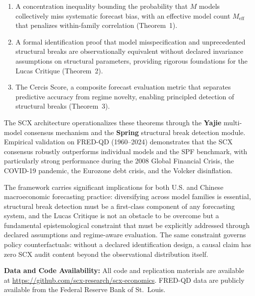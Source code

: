\documentclass[12pt,a4paper]{article}
\begin{document}
\begin{enumerate}[label=(\arabic*), leftmargin=*]
    \item A concentration inequality bounding the probability that
    $M$ models collectively miss systematic forecast bias, with an
    effective model count $M_{\text{eff}}$ that penalizes within-family
    correlation (Theorem~1).

    \item A formal identification proof that model misspecification
    and unprecedented structural breaks are observationally equivalent
    without declared invariance assumptions on structural parameters,
    providing rigorous foundations for the Lucas Critique (Theorem~2).

    \item The Cercis Score, a composite forecast evaluation metric
    that separates predictive accuracy from regime novelty, enabling
    principled detection of structural breaks (Theorem~3).
\end{enumerate}

The SCX architecture operationalizes these theorems through the
\textbf{Yajie} multi-model consensus mechanism and the \textbf{Spring}
structural break detection module.  Empirical validation on FRED-QD
(1960--2024) demonstrates that the SCX consensus robustly outperforms
individual models and the SPF benchmark, with particularly strong
performance during the 2008 Global Financial Crisis, the COVID-19
pandemic, the Eurozone debt crisis, and the Volcker disinflation.

The framework carries significant implications for both U.S. and
Chinese macroeconomic forecasting practice: diversifying across model
families is essential, structural break detection must be a first-class
component of any forecasting system, and the Lucas Critique is not an
obstacle to be overcome but a fundamental epistemological constraint
that must be explicitly addressed through declared assumptions and
regime-aware evaluation.  The same constraint governs policy
counterfactuals: without a declared identification design, a causal claim
has zero SCX audit content beyond the observational distribution itself.

\vspace{12pt}
\noindent\textbf{Data and Code Availability:}
All code and replication materials are available at
\url{https://github.com/scx-research/scx-economics}.  FRED-QD data
are publicly available from the Federal Reserve Bank of St.\ Louis.
\end{document}
